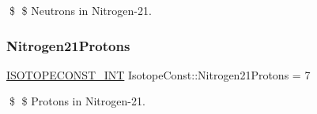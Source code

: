 \$ \$ Neutrons in Nitrogen-\/21. \mbox{\label{group___isotope_const-_nitrogen-_n21_ga17bacc10f6b60b23a609642cc575fd49}} 
\subsubsection{\texorpdfstring{Nitrogen21\+Protons}{Nitrogen21Protons}}
{\footnotesize\ttfamily \mbox{\hyperlink{group___isotope_const-_macros_ga5f18360b3e99483a35c32d789e62621c}{I\+S\+O\+T\+O\+P\+E\+C\+O\+N\+S\+T\+\_\+\+I\+NT}} Isotope\+Const\+::\+Nitrogen21\+Protons = 7}

\$ \$ Protons in Nitrogen-\/21. 